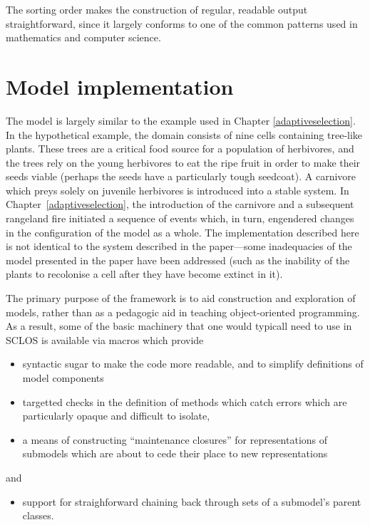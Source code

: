 The sorting order makes the construction of regular, readable output
straightforward, since it largely conforms to one of the common
patterns used in mathematics and computer science. 

\section{Model implementation}
The model is largely similar to the example used in Chapter
\ref{adaptiveselection}. In the hypothetical example, the domain
consists of nine cells containing tree-like plants. These trees are a
critical food source for a population of herbivores, and the trees
rely on the young herbivores to eat the ripe fruit in order to make
their seeds viable (perhaps the seeds have a particularly tough
seedcoat). A carnivore which preys solely on juvenile herbivores is
introduced into a stable system.  In Chapter~\ref{adaptiveselection},
the introduction of the carnivore and a subsequent rangeland fire
initiated a sequence of events which, in turn, engendered
changes in the configuration of the model as a whole.  The
implementation described here is not identical to the system described
in the paper---some inadequacies of the model presented in the paper
have been addressed (such as the inability of the plants to recolonise
a cell after they have become extinct in it).

The primary purpose of the framework is to aid construction and
exploration of models, rather than as a pedagogic aid in teaching
object-oriented programming. As a result, some of the basic machinery
that one would typicall need to use in \textsf{SCLOS} is available via
macros which provide
\begin{itemize}
   \item syntactic sugar to make the code more readable, and to simplify
     definitions of model components \\
   \item targetted checks in the definition of methods which catch
     errors which are particularly opaque and difficult to isolate,\\
   \item a means of constructing ``maintenance closures'' for
     representations of submodels which are about to cede their place
     to new representations
\end{itemize}
and
\begin{itemize}[resume]
\item support for straighforward chaining back through sets of
  a submodel's parent classes.
\end{itemize}

